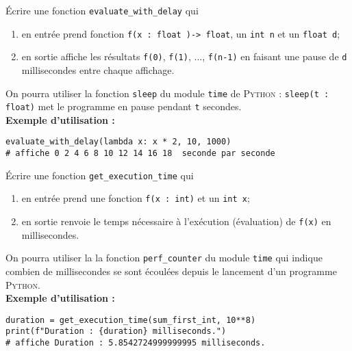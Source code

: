 \documentclass[a4paper,12pt,french]{article}
\begin{document}
\begin{exercice}[]
	\'Ecrire une fonction \texttt{evaluate_with_delay} qui 
	\begin{enumerate}[--]
		\item 	en entrée prend fonction \texttt{f(x : float )-> float}, un \texttt{int n} et un \texttt{float d}; 
		\item 	en sortie affiche les résultats \texttt{f(0)}, \texttt{f(1)}, ..., \texttt{f(n-1)} en faisant une pause de \texttt{d} millisecondes entre chaque affichage.
	\end{enumerate}
On pourra utiliser la fonction \texttt{sleep} du module \texttt{time} de \textsc{Python} : \texttt{sleep(t : float)} met le programme en pause pendant \texttt{t} secondes.\\
\textbf{Exemple d'utilisation :}
\begin{verbatim}
evaluate_with_delay(lambda x: x * 2, 10, 1000) 
# affiche 0 2 4 6 8 10 12 14 16 18  seconde par seconde
\end{verbatim}
\end{exercice}

\begin{exercice}
	\'Ecrire une fonction \texttt{get_execution_time} qui
\begin{enumerate}[--]
	\item 	en entrée prend une fonction \texttt{f(x : int)} et un \texttt{int x};
	\item 	en sortie renvoie le temps nécessaire à l'exécution (évaluation) de \texttt{f(x)} en millisecondes.
\end{enumerate}
On pourra utiliser la la fonction \texttt{perf_counter} du module \texttt{time} qui indique combien de millisecondes se sont écoulées depuis le lancement d'un programme \textsc{Python}.\\


\textbf{Exemple d'utilisation :}
\begin{verbatim}
duration = get_execution_time(sum_first_int, 10**8)
print(f"Duration : {duration} milliseconds.")
# affiche Duration : 5.8542724999999995 milliseconds.
\end{verbatim}
\end{exercice}
\end{document}
